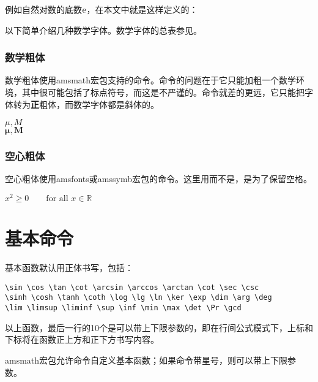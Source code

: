 {例如自然对数的底数$\ue$，在本文中就是这样定义的：
\begin{latex}{}
\newcommand{\ue}{\mathrm{e}}
\end{latex}

以下简单介绍几种数学字体。数学字体的总表参见。

\subsubsection{数学粗体}
数学粗体使用amsmath宏包支持的\latexline{\\boldsymbol}命令。命令\latexline{\\boldmath}的问题在于它只能加粗一个数学环境，其中很可能包括了标点符号，而这是不严谨的。命令\latexline{\\mathbf}就差的更远，它只能把字体转为\textbf{正}粗体，而数学字体都是斜体的。

\begin{codeshow}
$\mu,M$\\
$\boldsymbol{\mu},
\boldsymbol{M}$ \\
\end{codeshow}

\subsubsection{空心粗体}
空心粗体使用amsfonts或amssymb宏包的\latexline{\\mathbb}命令。这里用\latexline{\\textrm}而不是\latexline{\\mathrm}，是为了保留空格。

\begin{codeshow}
$x^2 \geq 0 \qquad
\textrm{for all }x\in\mathbb{R}$
\end{codeshow}

\section{基本命令}
基本函数默认用正体书写，包括：
\begin{verbatim}
\sin \cos \tan \cot \arcsin \arccos \arctan \cot \sec \csc
\sinh \cosh \tanh \coth \log \lg \ln \ker \exp \dim \arg \deg 
\lim \limsup \liminf \sup \inf \min \max \det \Pr \gcd
\end{verbatim}

以上函数，最后一行的10个是可以带上下限参数的，即在行间公式模式下，上标和下标将在函数正上方和正下方书写内容。

amsmath宏包允许\latexline{\\DeclareMathOperator}命令自定义基本函数；如果命令带星号，则可以带上下限参数。

}

